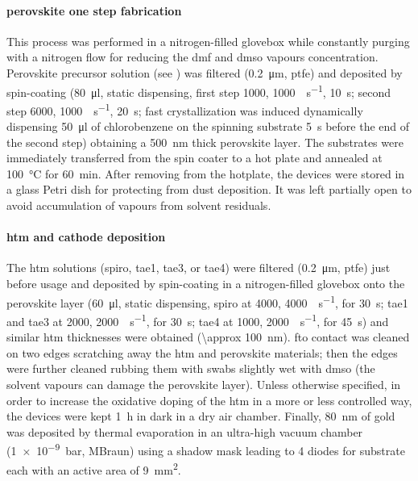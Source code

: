 
		\paragraph{ perovskite one step fabrication}

		This process was performed in a nitrogen-filled glovebox
		while constantly purging with a nitrogen flow for reducing the \gls{dmf} and \gls{dmso} vapours concentration.
		Perovskite precursor solution (see ) was filtered (\SI{0.2}{\um}, \gls{ptfe})
		and deposited by spin-coating (\SI{80}{\ul}, static dispensing, first step \SI{1000}{\rpm}, \SI{1000}{\rpm\per\s}, \SI{10}{\s};
		second step \SI{6000}{\rpm}, \SI{1000}{\rpm\per\s}, \SI{20}{\s}; fast crystallization was induced dynamically
		dispensing \SI{50}{\ul} of chlorobenzene on the spinning substrate \SI{5}{\s} before the end of the second
		step) obtaining a \SI{500}{\nm} thick perovskite layer.
		The substrates were immediately transferred from
		the spin coater to a hot plate and annealed at \SI{100}{\celsius} for \SI{60}{\minute}.
		After removing from the hotplate, the devices were stored in a glass Petri dish for protecting from dust deposition.
		It was left partially open to avoid accumulation of vapours from solvent residuals.

		\paragraph{\Gls{htm} and cathode deposition}
		The \gls{htm} solutions (\gls{spiro}, \gls{tae1}, \gls{tae3}, or \gls{tae4}) were filtered (\SI{0.2}{\um}, \gls{ptfe}) just before usage and deposited by spin-coating in a nitrogen-filled glovebox
		onto the perovskite layer (\SI{60}{\ul}, static dispensing, \gls{spiro} at \SI{4000}{\rpm}, \SI{4000}{\rpm\per\s},
		for \SI{30}{\s}; \gls{tae1} and \gls{tae3} at \SI{2000}{\rpm}, \SI{2000}{\rpm\per\s}, for \SI{30}{\s}; \gls{tae4} at \SI{1000}{\rpm}, \SI{2000}{\rpm\per\s},
		for \SI{45}{\s}) and similar \gls{htm} thicknesses were obtained (\SI{\approx 100}{\nm}).
		\Gls{fto} contact was cleaned on two edges scratching away the \gls{htm} and perovskite materials; then the edges were further cleaned rubbing them with swabs slightly wet with \gls{dmso} (the solvent vapours can damage the perovskite layer).
		Unless otherwise specified, in order to increase the
		oxidative doping of the \gls{htm} in a more or less controlled way, the devices were kept \SI{1}{\hour} in dark in a dry air chamber.
		Finally, \SI{80}{\nm} of gold was deposited by thermal evaporation in an ultra-high vacuum chamber
		(\SI{1e-9}{\bar}, MBraun) using a shadow mask leading to 4 diodes for substrate each with an active area of
		\SI{9}{\mm\squared}.
		\label{methods_bottom_end}


